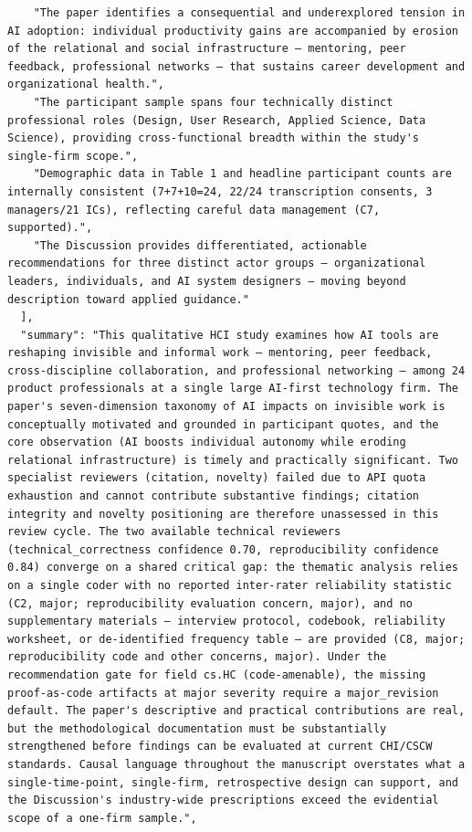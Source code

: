 \documentclass[11pt]{article}
\begin{document}
\begin{verbatim}
    "The paper identifies a consequential and underexplored tension in AI adoption: individual productivity gains are accompanied by erosion of the relational and social infrastructure — mentoring, peer feedback, professional networks — that sustains career development and organizational health.",
    "The participant sample spans four technically distinct professional roles (Design, User Research, Applied Science, Data Science), providing cross-functional breadth within the study's single-firm scope.",
    "Demographic data in Table 1 and headline participant counts are internally consistent (7+7+10=24, 22/24 transcription consents, 3 managers/21 ICs), reflecting careful data management (C7, supported).",
    "The Discussion provides differentiated, actionable recommendations for three distinct actor groups — organizational leaders, individuals, and AI system designers — moving beyond description toward applied guidance."
  ],
  "summary": "This qualitative HCI study examines how AI tools are reshaping invisible and informal work — mentoring, peer feedback, cross-discipline collaboration, and professional networking — among 24 product professionals at a single large AI-first technology firm. The paper's seven-dimension taxonomy of AI impacts on invisible work is conceptually motivated and grounded in participant quotes, and the core observation (AI boosts individual autonomy while eroding relational infrastructure) is timely and practically significant. Two specialist reviewers (citation, novelty) failed due to API quota exhaustion and cannot contribute substantive findings; citation integrity and novelty positioning are therefore unassessed in this review cycle. The two available technical reviewers (technical_correctness confidence 0.70, reproducibility confidence 0.84) converge on a shared critical gap: the thematic analysis relies on a single coder with no reported inter-rater reliability statistic (C2, major; reproducibility evaluation concern, major), and no supplementary materials — interview protocol, codebook, reliability worksheet, or de-identified frequency table — are provided (C8, major; reproducibility code and other concerns, major). Under the recommendation gate for field cs.HC (code-amenable), the missing proof-as-code artifacts at major severity require a major_revision default. The paper's descriptive and practical contributions are real, but the methodological documentation must be substantially strengthened before findings can be evaluated at current CHI/CSCW standards. Causal language throughout the manuscript overstates what a single-time-point, single-firm, retrospective design can support, and the Discussion's industry-wide prescriptions exceed the evidential scope of a one-firm sample.",

\end{verbatim}
\end{document}
